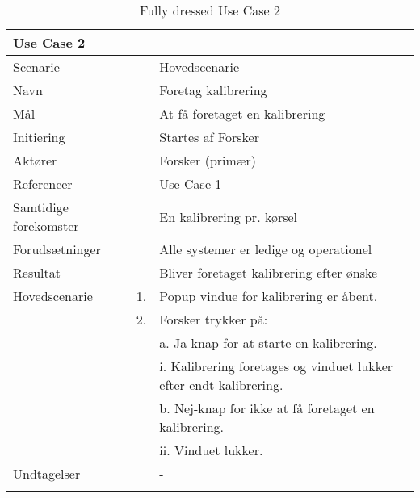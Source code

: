 \begin{longtabu} to  %
	{\large \textbf{Use Case 2}} && \\
	\toprule
	Scenarie && Hovedscenarie\\
	Navn && Foretag kalibrering\\
	Mål && At få foretaget en kalibrering\\
	Initiering && Startes af Forsker\\
	Aktører && Forsker (primær)\\
	Referencer && Use Case 1\\
	Samtidige forekomster  && En kalibrering pr. kørsel \\
	Forudsætninger && Alle systemer er ledige og operationel\\ 
	Resultat && Bliver foretaget kalibrering efter ønske\\ \midrule
	Hovedscenarie &    1. &		Popup vindue for kalibrering er åbent.\\				 	
	&    2. & Forsker trykker på:\\ 
	& &	a. Ja-knap for at starte en kalibrering.\\[-1ex]
	& &		 i. Kalibrering foretages og vinduet lukker efter endt kalibrering.\\[-1ex]
	& &  b. Nej-knap for ikke at få foretaget en kalibrering.\\[-1ex]
	& &   ii. Vinduet lukker.\\[-1ex]	
	Undtagelser && -  \\ \bottomrule
	
	\caption{Fully dressed Use Case 2}
	\label{UC2}
\end{longtabu}


